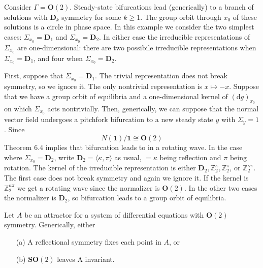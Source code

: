 \documentclass{scrartcl}
\begin{document}
    \begin{example}\label{golubitsky2000symmetry:ex:6.13}
      Consider \(\Gamma=\mathbf{O}(2)\).
      Steady-state bifurcations lead (generically) to a branch of solutions with \(\mathbf{D}_{k}\) symmetry for some \(k \geq 1\).
      The group orbit through \(x_{0}\) of these solutions is a circle in phase space.
      In this example we consider the two simplest cases: \(\Sigma_{x_{0}}=\mathbf{D}_{1}\) and \(\Sigma_{x_{0}}=\mathbf{D}_{2}\).
      In either case the irreducible representations of \(\Sigma_{x_{0}}\) are one-dimensional: there are two possibile irreducible representations when \(\Sigma_{x_{0}}=\mathbf{D}_{1}\), and four when \(\Sigma_{x_{0}}=\mathbf{D}_{2}\).

      First, suppose that \(\Sigma_{x_{0}}=\mathbf{D}_{1}\).
      The trivial representation does not break symmetry, so we ignore it.
      The only nontrivial representation is \(x \mapsto - x\).
      Suppose that we have a group orbit of equilibria and a one-dimensional kernel of \((\mathrm{d} g)_{x_{0}}\) on which \(\Sigma_{x_{0}}\) acts nontrivially.
      Then, generically, we can suppose that the normal vector field undergoes a pitchfork bifurcation to a new steady state \(y\) with \(\Sigma_{y} = 1\).
      Since
      \begin{equation*}
        N(\mathbf{1}) / \mathbf{1} \cong \mathbf{O}(2)
      \end{equation*}
      Theorem 6.4 implies that bifurcation leads to in a rotating wave.
      In the case where \(\Sigma_{x_{0}}=\mathbf{D}_{2}\), write \(\mathbf{D}_{2}=\langle\kappa, \pi\rangle\) as usual, \(=\kappa\) being reflection and \(\pi\) being rotation.
      The kernel of the irreducible representation is either \(\mathbf{D}_{2}, \mathbb{Z}_{2}^{\kappa}, \mathbb{Z}_{2}^{\pi}\), or \(\mathbb{Z}_{2}^{\kappa \pi}\).
      The first case does not break symmetry and again we ignore it.
      If the kernel is \(\mathbb{Z}_{2}^{\kappa \pi}\) we get a rotating wave since the normalizer is \(\mathbf{O}(2)\).
      In the other two cases the normalizer is \(\mathbf{D}_{2}\), so bifurcation leads to a group orbit of equilibria.
    \end{example}
    \begin{theorem}\label{notes_normal_forms:thm:9.8}
      Let \(A\) be an attractor for a system of differential equations with \(\mathbf{O}(2)\) symmetry.
      Generically, either
      \begin{enumerate}
        \item[(a)]  A reflectional symmetry fixes each point in \(A\), or
        \item[(b)]  \(\mathbf{S O}(2)\) leaves A invariant.
      \end{enumerate}
    \end{theorem}
\end{document}
